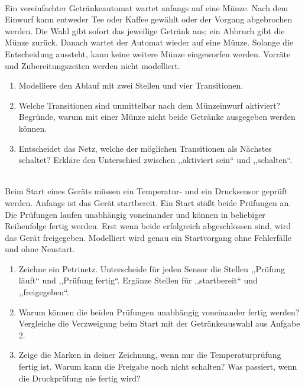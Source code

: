 \\
Ein vereinfachter Getränkeautomat wartet anfangs auf eine Münze. Nach dem Einwurf
kann entweder Tee oder Kaffee gewählt oder der Vorgang abgebrochen werden.
Die Wahl gibt sofort das jeweilige Getränk aus; ein Abbruch gibt die Münze zurück.
Danach wartet der Automat wieder auf eine Münze. Solange die Entscheidung aussteht,
kann keine weitere Münze eingeworfen werden. Vorräte und Zubereitungszeiten werden nicht modelliert.
\begin{enumerate}
  \item Modelliere den Ablauf mit zwei Stellen und vier Transitionen.
  \item Welche Transitionen sind unmittelbar nach dem Münzeinwurf aktiviert?
        Begründe, warum mit einer Münze nicht beide Getränke ausgegeben werden können.
  \item Entscheidet das Netz, welche der möglichen Transitionen als Nächstes schaltet?
        Erkläre den Unterschied zwischen ,,aktiviert sein`` und ,,schalten``.
\end{enumerate}

\clearpage
{}\\
Beim Start eines Geräts müssen ein Temperatur- und ein Drucksensor geprüft werden.
Anfangs ist das Gerät startbereit. Ein Start stößt beide Prüfungen an.
Die Prüfungen laufen unabhängig voneinander und können in beliebiger Reihenfolge
fertig werden. Erst wenn beide erfolgreich abgeschlossen sind, wird das Gerät
freigegeben. Modelliert wird genau ein Startvorgang ohne Fehlerfälle und ohne Neustart.
\begin{enumerate}
  \item Zeichne ein Petrinetz. Unterscheide für jeden Sensor die Stellen
        ,,Prüfung läuft`` und ,,Prüfung fertig``. Ergänze Stellen für
        ,,startbereit`` und ,,freigegeben``.
  \item Warum können die beiden Prüfungen unabhängig voneinander fertig werden?
        Vergleiche die Verzweigung beim Start mit der Getränkeauswahl aus Aufgabe 2.
  \item Zeige die Marken in deiner Zeichnung, wenn nur die Temperaturprüfung fertig ist.
        Warum kann die Freigabe noch nicht schalten? Was passiert, wenn die Druckprüfung nie fertig wird?
\end{enumerate}

